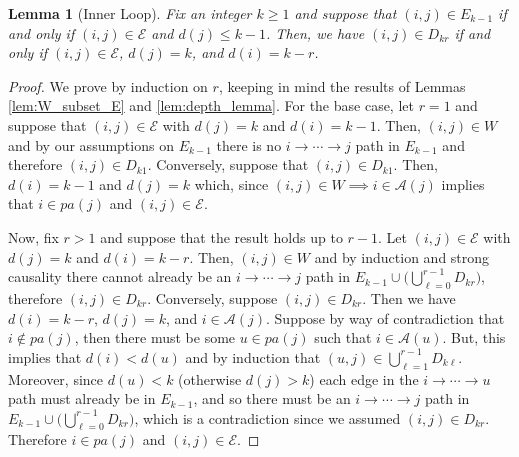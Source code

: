 \documentclass{statsoc}
\def\gcge{\mathcal{E}}  %
\newcommand{\pa}[1]{pa(#1)}  %
\newcommand{\anc}[1]{\mathcal{A}(#1)}  %
\newcommand{\gcgpath}[2]{#1 \rightarrow \cdots \rightarrow #2}  %
\newtheorem{lemma}{Lemma}
\begin{document}
\begin{lemma}[Inner Loop]
  \label{lem:inner_loop_lemma}
  Fix an integer $k \ge 1$ and suppose that $(i, j) \in E_{k - 1}$ if
  and only if $(i, j) \in \gcge$ and $d(j) \le k - 1$.  Then, we have
  $(i, j) \in D_{kr}$ if and only if $(i, j) \in \gcge $, $d(j) = k$,
  and $d(i) = k - r$.
\end{lemma}
\begin{proof}
  We prove by induction on $r$, keeping in mind the results of Lemmas
  \ref{lem:W_subset_E} and \ref{lem:depth_lemma}.  For the base case,
  let $r = 1$ and suppose that $(i, j) \in \gcge$ with $d(j) = k$ and
  $d(i) = k - 1$.  Then, $(i, j) \in W$ and by our assumptions on
  $E_{k - 1}$ there is no $\gcgpath{i}{j}$ path in $E_{k - 1}$
  and therefore $(i, j) \in D_{k1}$.  Conversely, suppose that
  $(i, j) \in D_{k1}$.  Then, $d(i) = k - 1$ and $d(j) = k$ which, since
  $(i, j) \in W \implies i \in \anc{j}$ implies that
  $i \in \pa{j}$ and $(i, j) \in \gcge$.

  Now, fix $r > 1$ and suppose that the result holds up to $r - 1$.
  Let $(i, j) \in \gcge$ with $d(j) = k$ and $d(i) = k - r$.  Then,
  $(i, j) \in W$ and by induction and strong causality there cannot
  already be an $\gcgpath{i}{j}$ path in
  $E_{k - 1} \cup \big(\bigcup_{\ell = 0}^{r - 1} D_{kr}\big)$,
  therefore $(i, j) \in D_{kr}$.  Conversely, suppose
  $(i, j) \in D_{kr}$.  Then we have $d(i) = k - r$, $d(j) = k$, and
  $i \in \anc{j}$.  Suppose by way of contradiction that
  $i \not\in \pa{j}$, then there must be some $u \in \pa{j}$ such that
  $i \in \anc{u}$.  But, this implies that $d(i) < d(u)$ and by
  induction that $(u, j) \in \bigcup_{\ell = 1}^{r - 1}D_{k\ell}$.
  Moreover, since $d(u) < k$ (otherwise $d(j) > k$) each edge in
  the $\gcgpath{i}{u}$ path must already be in $E_{k - 1}$, and so
  there must be an $\gcgpath{i}{j}$ path in
  $E_{k - 1}\cup\big(\bigcup_{\ell = 0}^{r - 1}D_{kr}\big)$, which is
  a contradiction since we assumed $(i, j) \in D_{kr}$.  Therefore
  $i \in \pa{j}$ and $(i, j) \in \gcge$.
\end{proof}
\end{document}
